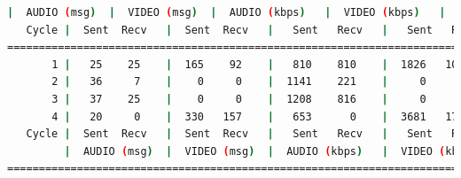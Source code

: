 \begin{lstlisting}[language=bash,basicstyle=\ttfamily\tiny]
         |  AUDIO (msg)  |  VIDEO (msg)  |  AUDIO (kbps)   |  VIDEO (kbps)   |     CPU (%) 
   Cycle |  Sent  Recv   |  Sent  Recv   |   Sent   Recv   |   Sent   Recv   | Program System
================================================================================================
       1 |   25    25    |  165    92    |   810    810    |  1826   1019    |  21    100       
       2 |   36     7    |    0     0    |  1141    221    |     0      0    |  43     76       
       3 |   37    25    |    0     0    |  1208    816    |     0      0    |  44     75       
       4 |   20     0    |  330   157    |   653      0    |  3681   1751    |  21     69       
   Cycle |  Sent  Recv   |  Sent  Recv   |   Sent   Recv   |   Sent   Recv   | Program System
         |  AUDIO (msg)  |  VIDEO (msg)  |  AUDIO (kbps)   |  VIDEO (kbps)   |     CPU (%) 
===========================================================================================
\end{lstlisting}

